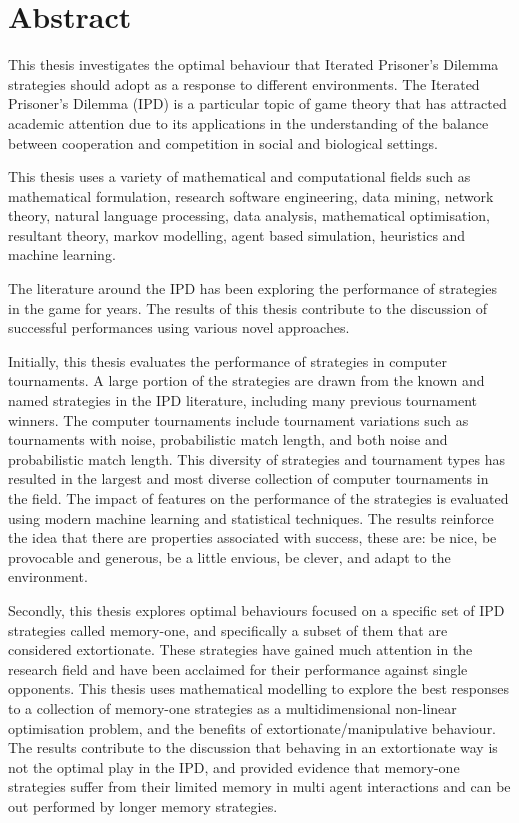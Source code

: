 \chapter{Abstract}

This thesis investigates the optimal behaviour that Iterated Prisoner's Dilemma
strategies should adopt as a response to different environments. The Iterated
Prisoner's Dilemma (IPD) is a particular topic of game theory that has attracted
academic attention due to its applications in the understanding of
the balance between cooperation and competition in social and biological
settings.

This thesis uses a variety of mathematical and computational fields such as
mathematical formulation, research software engineering, data mining, network
theory, natural language processing, data analysis, mathematical
optimisation, resultant theory, markov modelling, agent based simulation,
heuristics and machine learning. %

The literature around the IPD has been exploring the performance of strategies
in the game for years. The results of this thesis contribute to the discussion
of successful performances using various novel approaches.

Initially, this thesis evaluates the performance of \numberofstrategies
strategies in \numberofalltournaments computer tournaments. A large portion of
the \numberofstrategies strategies are drawn from the known and named strategies in the IPD
literature, including many previous tournament winners. The \numberofalltournaments
computer tournaments include tournament variations such as tournaments with
noise, probabilistic match length, and both noise and probabilistic match
length. This diversity of strategies and tournament types has resulted in the largest and
most diverse collection of computer tournaments in the field. The impact of
features on the performance of the \numberofstrategies strategies is evaluated
using modern machine learning and statistical techniques. The results reinforce
the idea that there are properties associated with success, these are: be nice,
be provocable and generous, be a little envious, be clever, and adapt to the
environment.

Secondly, this thesis explores optimal behaviours focused on a specific set of
IPD strategies called memory-one, and specifically a subset of them that are
considered extortionate. These strategies have gained much attention in the
research field and have been acclaimed for their performance against single
opponents. This thesis uses  mathematical modelling to explore the best
responses to a collection of memory-one strategies as a multidimensional non-linear
optimisation problem, and the benefits of extortionate/manipulative
behaviour. The results contribute to the discussion that behaving in an
extortionate way is not the optimal play in the IPD, and provided evidence that
memory-one strategies suffer from their limited memory in multi agent
interactions and can be out performed by longer memory strategies.

